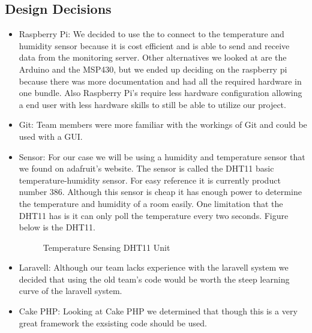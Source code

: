 \documentclass{report}
\begin{document}
\subsection*{Design Decisions}
\begin{itemize}
\item Raspberry Pi: We decided to use the to connect to the temperature and humidity sensor because it is cost efficient and is able to send and receive data from the monitoring server. 
Other alternatives we looked at are the Arduino and the MSP430, but we ended up deciding on the raspberry pi because there was more documentation and had all the required hardware in one bundle.
Also Raspberry Pi’s require less hardware configuration allowing a end user with less hardware skills to still be able to utilize our project.
\item Git: Team members were more familiar with the workings of Git and could be used with a GUI.
\item Sensor: For our case we will be using a humidity and temperature sensor that we found on adafruit's website.
The sensor is called the DHT11 basic temperature-humidity sensor. 
For easy reference it is currently product number 386.
Although this sensor is cheap it has enough power to determine the temperature and humidity of a room easily.
One limitation that the DHT11 has is it can only poll the temperature every two seconds.
Figure below is the DHT11.

\begin{figure}[H]
\caption{Temperature Sensing DHT11 Unit}
\end{figure}


\item Laravell: Although our team lacks experience with the laravell system we decided that using the old team's code would be worth the steep learning curve of the laravell system.
\item Cake PHP: Looking at Cake PHP we determined that though this is a very great framework the exsisting code should be used.
\end{itemize}
\end{document}
